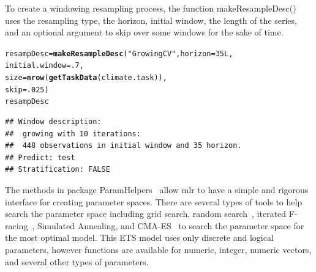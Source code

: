 \documentclass[12pt]{article}\usepackage[]{graphicx}\usepackage[]{color}
\makeatletter
\newcommand{\hlnum}[1]{\textcolor[rgb]{0.686,0.059,0.569}{#1}}%
\newcommand{\hlstr}[1]{\textcolor[rgb]{0.192,0.494,0.8}{#1}}%
\newcommand{\hlstd}[1]{\textcolor[rgb]{0.345,0.345,0.345}{#1}}%
\newcommand{\hlkwb}[1]{\textcolor[rgb]{0.69,0.353,0.396}{#1}}%
\newcommand{\hlkwc}[1]{\textcolor[rgb]{0.333,0.667,0.333}{#1}}%
\newcommand{\hlkwd}[1]{\textcolor[rgb]{0.737,0.353,0.396}{\textbf{#1}}}%
\newenvironment{kframe}{%
 \def\at@end@of@kframe{}%
 \ifinner\ifhmode%
  \def\at@end@of@kframe{\end{minipage}}%
  \begin{minipage}{\columnwidth}%
 \fi\fi%
 \def\FrameCommand##1{\hskip\@totalleftmargin \hskip-\fboxsep
 \colorbox{shadecolor}{##1}\hskip-\fboxsep
     \hskip-\linewidth \hskip-\@totalleftmargin \hskip\columnwidth}%
 \MakeFramed {\advance\hsize-\width
   \@totalleftmargin\z@ \linewidth\hsize
   \@setminipage}}%
 {\par\unskip\endMakeFramed%
 \at@end@of@kframe}
\newenvironment{knitrout}{}{} %
\theoremstyle{definition}
\newcommand\code{\@codex}
\def\@codex#1{{\normalfont\ttfamily\hyphenchar\font=-1 #1}}
\newcommand{\pkg}[1]{{\fontseries{b}\selectfont #1}}
\makeatother
\begin{document}
To create a windowing resampling process, the function \code{makeResampleDesc()} uses the resampling type, the horizon, initial window, the length of the series, and an optional argument to skip over some windows for the sake of time.

\singlespacing
\begin{knitrout}
\color{fgcolor}\begin{kframe}
\begin{alltt}
\hlstd{resampDesc} \hlkwb{=} \hlkwd{makeResampleDesc}\hlstd{(}\hlstr{"GrowingCV"}\hlstd{,} \hlkwc{horizon} \hlstd{=} \hlnum{35L}\hlstd{,}
                          \hlkwc{initial.window} \hlstd{=} \hlnum{.7}\hlstd{,}
                          \hlkwc{size} \hlstd{=} \hlkwd{nrow}\hlstd{(}\hlkwd{getTaskData}\hlstd{(climate.task)),}
                          \hlkwc{skip} \hlstd{=} \hlnum{.025}\hlstd{)}
\hlstd{resampDesc}
\end{alltt}
\begin{verbatim}
## Window description:
##  growing with 10 iterations:
##  448 observations in initial window and 35 horizon.
## Predict: test
## Stratification: FALSE
\end{verbatim}
\end{kframe}
\end{knitrout}
\doublespacing

The methods in package \pkg{ParamHelpers}~\cite{paramhelper} allow \pkg{mlr} to have a simple and rigorous interface for creating parameter spaces. There are several types of tools to help search the parameter space including grid search, random search~\cite{Bergstra}, iterated F-racing~\cite{irace}, Simulated Annealing, and CMA-ES~\cite{cmaes}  to search the parameter space for the most optimal model. This ETS model uses only discrete and logical parameters, however functions are available for numeric, integer, numeric vectors, and several other types of parameters.
\end{document}
